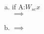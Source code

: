\begin{enumerate}
\begin{enumerate}[a.]
	\item if A:$W_{sc}x$\\
		 $\implies$ 
	
	\item
		 $\implies$ 
	\end{enumerate}
	
\end{enumerate}